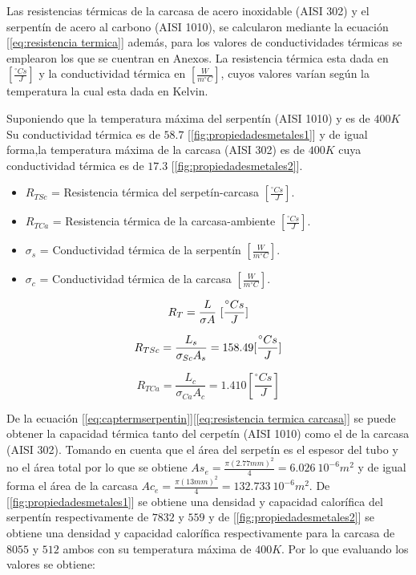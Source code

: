 \documentclass[12pt,letterpaper]{article}     %
\begin{document}
Las resistencias térmicas de la carcasa de acero inoxidable (AISI 302) y el serpentín de acero al carbono (AISI 1010), se calcularon mediante la ecuación [\ref{eq:resistencia termica}] además, para los valores de conductividades térmicas se emplearon los que se cuentran en Anexos. La resistencia térmica esta dada en $[\frac{^{\circ}C s}{J}]$ y la conductividad térmica en $[\frac{W}{m ^{\circ}C}]$, cuyos valores varían según la temperatura la cual esta dada en Kelvin.

Suponiendo que la temperatura máxima del serpentín (AISI 1010) y  es de $400K$ Su conductividad térmica es de $58.7$ [\ref{fig:propiedadesmetales1}] y de igual forma,la temperatura máxima de la carcasa (AISI 302) es de $400 K$ cuya conductividad térmica es de $17.3$ [\ref{fig:propiedadesmetales2}].

\begin{itemize}
    \item $R_{TSc}$ = Resistencia térmica del serpetín-carcasa $[\frac{^{\circ}C s}{J}]$.
     \item $R_{TCa}$ = Resistencia térmica de la carcasa-ambiente $[\frac{^{\circ}C s}{J}]$.
     \item $\sigma_{s}$ = Conductividad térmica de la serpentín $[\frac{W}{m ^{\circ}C}]$.
     \item $\sigma_{c}$ = Conductividad térmica de la carcasa $[\frac{W}{m ^{\circ}C}]$.
\end{itemize}

\begin{equation}
R_{T} = \frac{L}{\sigma A} \ [\frac{^{\circ}C s}{J}] \label{eq:resistencia termica}\\ 
\end{equation} 

\begin{equation}
R_{TSc} = \frac{L_{s}}{\sigma_{Sc} A_{s}} = 158.49[\frac{^{\circ}C s}{J}]   \label{eq:resistencia termica serpentin}\\
\end{equation} 

\begin{equation}
R_{TCa} = \frac{L_{c}}{\sigma_{Ca} A_{c}} = 1.410[\frac{^{\circ}C s}{J}] \label{eq:resistencia termica carcasa}
\end{equation} 

De la ecuación [\ref{eq:captermserpentin}][\ref{eq:resistencia termica carcasa}] se puede obtener la capacidad térmica tanto del cerpetín (AISI 1010) como el de la carcasa (AISI 302). Tomando en cuenta que el área del serpetín es el espesor del tubo y no el área total por lo que se obtiene $As_{e} = \frac{\pi (2.77mm)^{2}}{4} = 6.026 \ 10^{-6}m^{2}$ y de igual forma el área de la carcasa $Ac_{e} = \frac{\pi (13mm)^{2}}{4} = 132.733 \ 10^{-6}m^{2}$. De [\ref{fig:propiedadesmetales1}] se obtiene una densidad y capacidad calorífica del serpentín respectivamente de $7832 $ y $559$ y de [\ref{fig:propiedadesmetales2}] se obtiene una densidad y capacidad calorífica respectivamente para la carcasa de $8055$ y $512$ ambos con su temperatura máxima de $400K$. Por lo que evaluando los valores se obtiene: 
\end{document}
